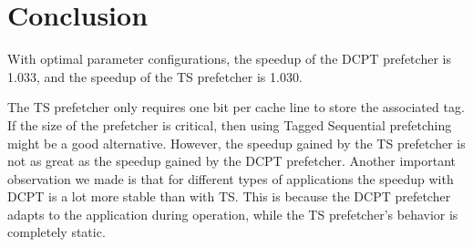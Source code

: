 \section{Conclusion}
With optimal parameter configurations, the speedup of the 
DCPT prefetcher is 1.033, and the speedup of the TS prefetcher is 1.030.

The TS prefetcher only requires one bit per cache line to store
the associated tag. If the size of the prefetcher is critical, then using Tagged
Sequential prefetching might be a good alternative. However, the speedup gained
by the TS prefetcher is not as great as the speedup gained by the
DCPT prefetcher. Another important observation we made is that for different 
types of applications the speedup with DCPT is a lot more stable than with TS. 
This is because the DCPT prefetcher adapts to the application during operation, 
while the TS prefetcher's behavior is completely static. 


